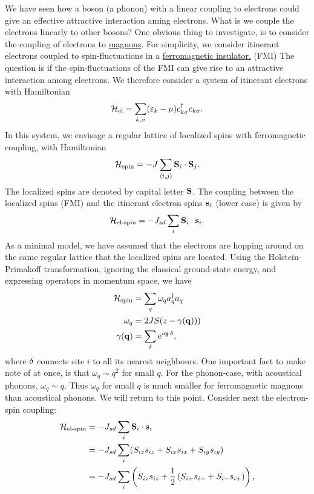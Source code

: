 We have seen how a boson (a phonon) with a linear coupling to electrons could give an effective attractive interaction aming electrons. 
What is we couple the electrons linearly to other bosons? One obvious thing to investigate, is to consider the coupling of electrons to \underline{magnons}.
For simplicity, we consider itinerant electrons coupled to spin-fluctuations in a \underline{ferromagnetic insulator.} (FMI) The question is if the spin-fluctuations of the FMI can give rise to an attractive interaction among electrons.
We therefore consider a system of itinerant electrons with Hamiltonian 
\begin{equation}
	\mathcal{H}_{\text{el}} = \sum_{k, \sigma}(\varepsilon_{k}-\mu)c_{k\sigma}^\dagger c_{k\sigma}.
\end{equation}
In this system, we envisage a regular lattice of localized spins with ferromagnetic coupling, with Hamiltonian
\begin{equation}
	\mathcal{H}_{\text{spin}} = -J\sum_{\langle i,j\rangle}\vb S_i\cdot\vb S_j.
	\end{equation}
The localized spins are denoted by capital letter $\vb S$.
The coupling between the localized spins (FMI) and the itinerant electron spins $\vb s_i$ (lower case) is given by 
\begin{equation}
	\mathcal{H}_{\text{el-spin}}  = -J_{sd}\sum_i\vb S_i\cdot \vb s_i.
\end{equation}
As a minimal model, we have assumed that the electrons are hopping around on the same regular lattice that the localized spins are located. 
Using the Holstein-Primakoff transformation, ignoring the classical ground-state energy, and expressing operators in momentum space, we have 
\begin{align}
	\mathcal{H}_{\text{spin}} &= \sum_q \omega_qa_q^\dagger a_q \\
	\omega_q &= 2JS(z- \gamma(\vb q))) \\
	\gamma(\vb q) &= \sum_\delta\mathrm{e}^{i\vb q\cdot \vb \delta},
\end{align}
where $\vb \delta$ connects site $i$ to all its nearest neighbours.
One important fact to make note of at once, is that $\omega_q \sim q^2$ for small $q$. For the phonon-case, with acoustical phonons, $\omega_q \sim q$. Thus $\omega_q$ for small $q$ is much smaller for ferromagnetic magnons than acoustical phonons. We will return to this point. 
Consider next the electron-spin coupling: 
\begin{align}
	\mathcal{H}_\text{el-spin} &= -J_{sd}\sum_i\vb S_i\cdot \vb s_i \\
	&=-J_{sd}\sum_i(S_{iz}s_{iz} + S_{ix}s_{ix} + S_{iy}s_{iy}) \\
	&=-J_{sd}\sum_i\left(S_{iz}s_{iz}+ \frac12\left(S_{i+}s_{i-} + S_{i-}s_{i+}\right)\right),
\end{align}
